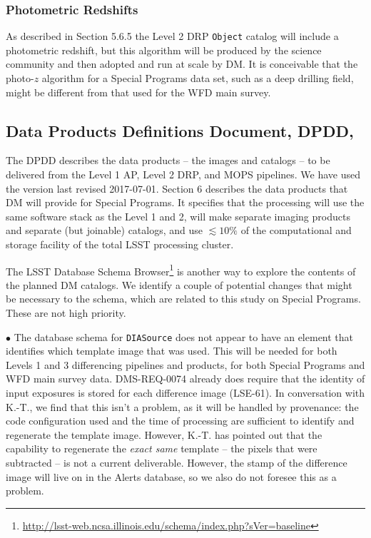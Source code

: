 \subsubsection{Photometric Redshifts} As described in Section 5.6.5 the Level 2 DRP \texttt{Object} catalog will include a photometric redshift, but this algorithm will be produced by the science community and then adopted and run at scale by DM. It is conceivable that the photo-$z$ algorithm for a Special Programs data set, such as a deep drilling field, might be different from that used for the WFD main survey.

\subsection{Data Products Definitions Document, DPDD, }\label{ssec:docrev_dpdd}

The DPDD describes the data products -- the images and catalogs -- to be delivered from the Level 1 AP, Level 2 DRP, and MOPS pipelines. We have used the version last revised 2017-07-01. Section 6 describes the data products that DM will provide for Special Programs. It specifies that the processing will use the same software stack as the Level 1 and 2, will make separate imaging products and separate (but joinable) catalogs, and use $\lesssim10\%$ of the computational and storage facility of the total LSST processing cluster.

The LSST Database Schema Browser\footnote{\url{http://lsst-web.ncsa.illinois.edu/schema/index.php?sVer=baseline}} is another way to explore the contents of the planned DM catalogs. We identify a couple of potential changes that might be necessary to the schema, which are related to this study on Special Programs. These are not high priority.

$\bullet$ The database schema for \texttt{DIASource} does not appear to have an element that identifies which template image that was used. This will be needed for both Levels 1 and 3 differencing pipelines and products, for both Special Programs and WFD main survey data. DMS-REQ-0074 already does require that the identity of input exposures is stored for each difference image (LSE-61). In conversation with K.-T., we find that this isn't a problem, as it will be handled by provenance: the code configuration used and the time of processing are sufficient to identify and regenerate the template image. However, K.-T. has pointed out that the capability to regenerate the \textit{exact same} template -- the pixels that were subtracted -- is not a current deliverable. However, the stamp of the difference image will live on in the Alerts database, so we also do not foresee this as a problem.

